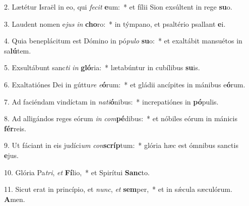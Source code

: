 2. Lætétur Israël in eo, qui \textit{fe}\textit{cit} \textbf{e}um:~*  et fílii Sion exsúltent in rege \textbf{su}o.\

3. Laudent nomen e\textit{jus} \textit{in} \textbf{cho}ro:~*  in týmpano, et psaltério psallant \textbf{e}i.\

4. Quia beneplácitum est Dómino in pó\textit{pu}\textit{lo} \textbf{su}o:~*  et exaltábit mansuétos in sa\textbf{lú}tem.\

5. Exsultábunt sanc\textit{ti} \textit{in} \textbf{gló}ria:~*  lætabúntur in cubílibus \textbf{su}is.\

6. Exaltatiónes Dei in gúttu\textit{re} \textit{e}\textbf{ó}rum:~*  et gládii ancípites in mánibus e\textbf{ó}rum.\

7. Ad faciéndam vindíctam in \textit{na}\textit{ti}\textbf{ó}nibus:~*  increpatiónes in \textbf{pó}pulis.\

8. Ad alligándos reges eórum \textit{in} \textit{com}\textbf{pé}dibus:~*  et nóbiles eórum in mánicis \textbf{fér}reis.\

9. Ut fáciant in eis judíci\textit{um} \textit{con}\textbf{scríp}tum:~*  glória hæc est ómnibus sanctis \textbf{e}jus.\

10. Glória Pa\textit{tri}, \textit{et} \textbf{Fí}lio,~*  et Spirítui \textbf{Sanc}to.\

11. Sicut erat in princípio, et \textit{nunc}, \textit{et} \textbf{sem}per,~*  et in sǽcula sæculórum. \textbf{A}men.\

